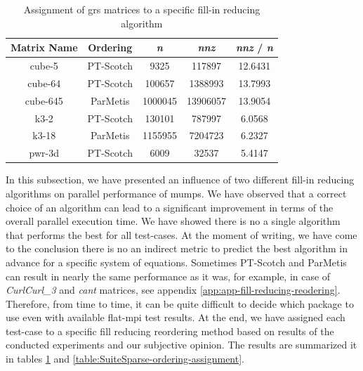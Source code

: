 \begin{table}[htpb]
\centering
\begin{tabular}{|c|c|c|c|c|}
\hline
Matrix Name & Ordering  & \textit{n}       & \textit{nnz}      & \textit{nnz} / \textit{n} \\ \hline
cube-5      & PT-Scotch & 9325    & 117897   & 12.6431 \\ \hline
cube-64     & PT-Scotch & 100657  & 1388993  & 13.7993 \\ \hline
cube-645    & ParMetis  & 1000045 & 13906057 & 13.9054 \\ \hline
k3-2        & PT-Scotch & 130101  & 787997   & 6.0568  \\ \hline
k3-18       & ParMetis  & 1155955 & 7204723  & 6.2327  \\ \hline
pwr-3d      & PT-Scotch & 6009    & 32537    & 5.4147  \\ \hline
\end{tabular}
\caption{Assignment of \acrshort{grs} matrices to a specific fill-in reducing algorithm}
\label{table:GRS-ordering-assignment}
\end{table}


In this subsection, we have presented an influence of  two different fill-in reducing algorithms on parallel performance of \acrshort{mumps}. We have observed that a correct choice of an algorithm can lead to a significant improvement in terms of the overall parallel execution time. We have showed there is no a single algorithm that performs the best for all test-cases. At the moment of writing, we have come to the conclusion there is no an indirect metric to predict the best algorithm in advance for a specific system of equations. Sometimes PT-Scotch and ParMetis can result in nearly the same performance as it was, for example, in case of \textit{CurlCurl\_3} and \textit{cant} matrices, see appendix \ref{app:app-fill-reducing-reodering}. Therefore, from time to time, it can be quite difficult to decide which package to use even with available flat-\acrshort{mpi} test results. At the end, we have assigned each test-case to a specific fill reducing reordering method based on results of the conducted experiments and our subjective opinion. The results are summarized it in tables \ref{table:GRS-ordering-assignment} and \ref{table:SuiteSparse-ordering-assignment}. \\ 


